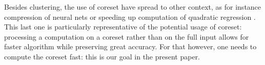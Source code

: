 Besides clustering, the use of coreset have spread to other context, as for instance compression of neural nets \cite{BaykalLGFR19} or speeding up computation of quadratic regression \cite{MaaloufJF19}.
This last one is particularly representative of the potential usage of coreset: processing a computation on a coreset rather than on the full input allows for faster algorithm while preserving great accuracy.
For that however, one needs to compute the coreset fast: this is our goal in the present paper.

